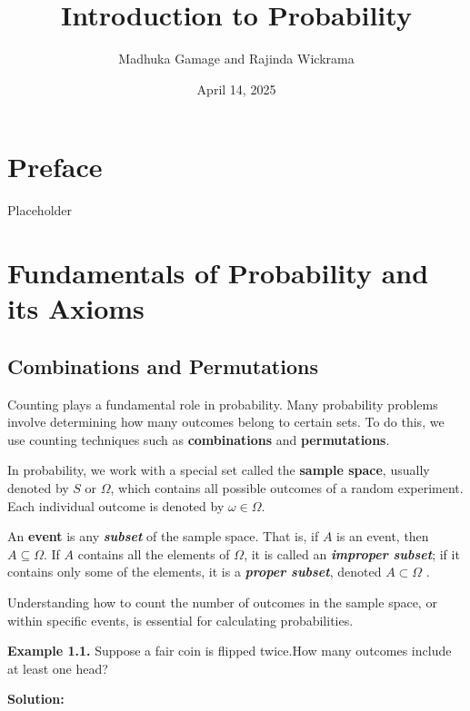 \documentclass[
  12pt,
]{krantzNoCorner}
\title{Introduction to Probability}
\author{Madhuka Gamage and Rajinda Wickrama}
\date{April 14, 2025}
\begin{document}
\maketitle

{
\hypersetup{linkcolor=}
\setcounter{tocdepth}{2}
\tableofcontents
}
\hypertarget{preface}{%
\chapter*{Preface}\label{preface}}


Placeholder

\hypertarget{fundamentals-of-probability-and-its-axioms}{%
\chapter{Fundamentals of Probability and its Axioms}\label{fundamentals-of-probability-and-its-axioms}}

\hypertarget{combinations-and-permutations}{%
\section{Combinations and Permutations}\label{combinations-and-permutations}}

Counting plays a fundamental role in probability. Many probability problems involve determining how many outcomes belong to certain sets. To do this, we use counting techniques such as \textbf{combinations} and \textbf{permutations}.

In probability, we work with a special set called the \textbf{sample space}, usually denoted by \(S\) or \(\Omega\), which contains all possible outcomes of a random experiment. Each individual outcome is denoted by \(\omega \in \Omega\).

An \textbf{event} is any \textbf{\emph{subset}} of the sample space. That is, if \(A\) is an event, then \(A \subseteq \Omega\). If \(A\) contains all the elements of \(\Omega\), it is called an \textbf{\emph{improper subset}}; if it contains only some of the elements, it is a \textbf{\emph{proper subset}}, denoted \(A \subset \Omega\) .

Understanding how to count the number of outcomes in the sample space, or within specific events, is essential for calculating probabilities.

\textbf{Example 1.1.} Suppose a fair coin is flipped twice.How many outcomes include at least one head?

\textbf{Solution:}
\end{document}
